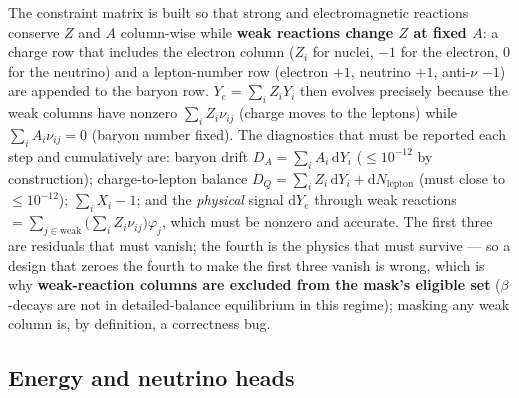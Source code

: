 \documentclass[11pt]{article}
\newcommand{\Ye}{Y_{e}}
\newcommand{\dd}{\mathrm{d}}
\begin{document}
The constraint matrix is built so that strong and electromagnetic reactions conserve $Z$ and $A$ column-wise while \textbf{weak reactions change $Z$ at fixed $A$}: a charge row that includes the electron column ($Z_i$ for nuclei, $-1$ for the electron, $0$ for the neutrino) and a lepton-number row (electron $+1$, neutrino $+1$, anti-$\nu$ $-1$) are appended to the baryon row. $\Ye = \sum_i Z_i Y_i$ then evolves precisely because the weak columns have nonzero $\sum_i Z_i \nu_{ij}$ (charge moves to the leptons) while $\sum_i A_i \nu_{ij} = 0$ (baryon number fixed). The diagnostics that must be reported each step and cumulatively are: baryon drift $D_A = \sum_i A_i\,\dd Y_i$ ($\le 10^{-12}$ by construction); charge-to-lepton balance $D_Q = \sum_i Z_i\,\dd Y_i + \dd N_{\text{lepton}}$ (must close to $\le 10^{-12}$); $\sum_i X_i - 1$; and the \emph{physical} signal $\dd \Ye$ through weak reactions $= \sum_{j\in\text{weak}} \big(\sum_i Z_i \nu_{ij}\big)\varphi_j$, which must be nonzero and accurate. The first three are residuals that must vanish; the fourth is the physics that must survive --- so a design that zeroes the fourth to make the first three vanish is wrong, which is why \textbf{weak-reaction columns are excluded from the mask's eligible set} ($\beta$-decays are not in detailed-balance equilibrium in this regime); masking any weak column is, by definition, a correctness bug.

\subsection{Energy and neutrino heads}
\end{document}
